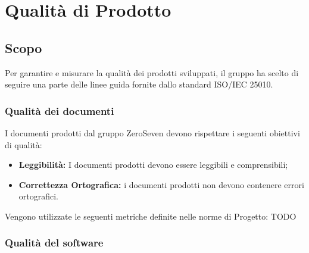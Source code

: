 \chapter{Qualità di Prodotto}
\section{Scopo}
Per garantire e misurare la qualità dei prodotti sviluppati, il gruppo ha scelto di seguire una parte delle linee guida fornite dallo standard ISO/IEC 25010.\\
\subsection{Qualità dei documenti}
I documenti prodotti dal gruppo ZeroSeven devono rispettare i seguenti obiettivi di qualità:
\begin{itemize}
    \item \textbf{Leggibilità:} I documenti prodotti devono essere leggibili e comprensibili;
    \item \textbf{Correttezza Ortografica:} i documenti prodotti non devono contenere errori ortografici.
\end{itemize}
Vengono utilizzate le seguenti metriche definite nelle norme di Progetto:
TODO

\subsection{Qualità del software}

